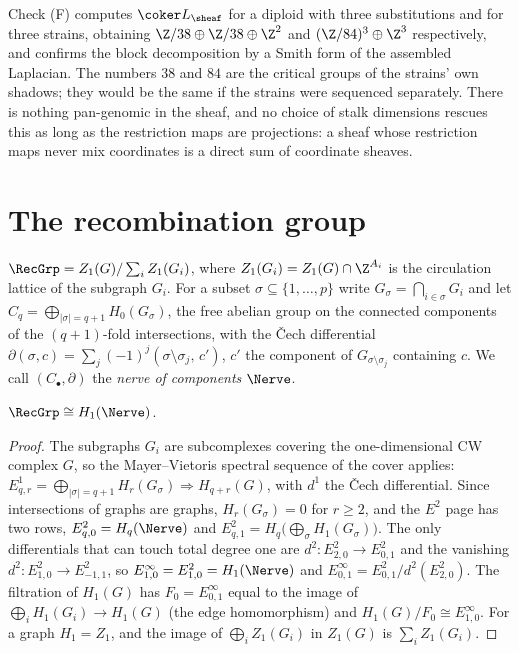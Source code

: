 Check (F) computes $\coker L_\sheaf$ for a diploid with three substitutions and for three
strains, obtaining $\Z/38\oplus\Z/38\oplus\Z^2$ and $(\Z/84)^3\oplus\Z^3$ respectively, and
confirms the block decomposition by a Smith form of the assembled Laplacian. The numbers
$38$ and $84$ are the critical groups of the strains' own shadows; they would be the same if
the strains were sequenced separately. There is nothing pan-genomic in the sheaf, and no
choice of stalk dimensions rescues this as long as the restriction maps are projections: a
sheaf whose restriction maps never mix coordinates is a direct sum of coordinate sheaves.

\section{The recombination group}\label{ch14:sec:R}

\begin{definition}
$\RecGrp=Z_1(G)/\sum_iZ_1(G_i)$, where $Z_1(G_i)=Z_1(G)\cap\Z^{A_i}$ is the circulation
lattice of the subgraph $G_i$. For a subset $\sigma\subseteq\{1,\dots,p\}$ write
$G_\sigma=\bigcap_{i\in\sigma}G_i$ and let $C_q=\bigoplus_{|\sigma|=q+1}H_0(G_\sigma)$, the
free abelian group on the connected components of the $(q{+}1)$-fold intersections, with the
\v Cech differential $\partial(\sigma,c)=\sum_j(-1)^j(\sigma\setminus\sigma_j,\,c')$, $c'$
the component of $G_{\sigma\setminus\sigma_j}$ containing $c$. We call $(C_\bullet,\partial)$
the \emph{nerve of components} $\Nerve$.
\end{definition}

\begin{theorem}\label{ch14:thm:mv}
$\RecGrp\cong H_1(\Nerve)$.
\end{theorem}

\begin{proof}
The subgraphs $G_i$ are subcomplexes covering the one-dimensional CW complex $G$, so the
Mayer--Vietoris spectral sequence of the cover \cite[VII.4]{Bro82} applies:
$E^1_{q,r}=\bigoplus_{|\sigma|=q+1}H_r(G_\sigma)\Rightarrow H_{q+r}(G)$, with $d^1$ the
\v Cech differential. Since intersections of graphs are graphs, $H_r(G_\sigma)=0$ for
$r\ge2$, and the $E^2$ page has two rows, $E^2_{q,0}=H_q(\Nerve)$ and
$E^2_{q,1}=H_q\big(\bigoplus_\sigma H_1(G_\sigma)\big)$. The only differentials that can
touch total degree one are $d^2\colon E^2_{2,0}\to E^2_{0,1}$ and the vanishing
$d^2\colon E^2_{1,0}\to E^2_{-1,1}$, so $E^\infty_{1,0}=E^2_{1,0}=H_1(\Nerve)$ and
$E^\infty_{0,1}=E^2_{0,1}/d^2(E^2_{2,0})$. The filtration of $H_1(G)$ has $F_0=E^\infty_{0,1}$
equal to the image of $\bigoplus_iH_1(G_i)\to H_1(G)$ (the edge homomorphism) and
$H_1(G)/F_0\cong E^\infty_{1,0}$. For a graph $H_1=Z_1$, and the image of
$\bigoplus_iZ_1(G_i)$ in $Z_1(G)$ is $\sum_iZ_1(G_i)$.
\end{proof}

